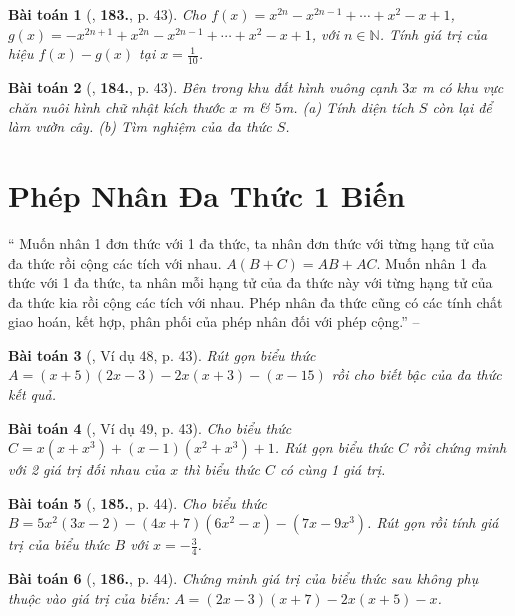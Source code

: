 \documentclass{article}
\numberwithin{equation}{section}
\newtheorem{baitoan}{Bài toán}
\begin{document}
\begin{baitoan}[\cite{Tuyen_Toan_7}, \textbf{183.}, p. 43]
	Cho $f(x) = x^{2n} - x^{2n-1} + \cdots + x^2 - x + 1$, $g(x) = -x^{2n+1} + x^{2n} - x^{2n-1} + \cdots + x^2 - x + 1$, với $n\in\mathbb{N}$. Tính giá trị của hiệu $f(x) - g(x)$ tại $x = \frac{1}{10}$.
\end{baitoan}

\begin{baitoan}[\cite{Tuyen_Toan_7}, \textbf{184.}, p. 43]
	Bên trong khu đất hình vuông cạnh $3x$ \emph{m} có khu vực chăn nuôi hình chữ nhật kích thước $x$ \emph{m} \& $5$\emph{m}. (a) Tính diện tích $S$ còn lại để làm vườn cây. (b) Tìm nghiệm của đa thức $S$.
\end{baitoan}


\section{Phép Nhân Đa Thức 1 Biến}
`` Muốn nhân 1 đơn thức với 1 đa thức, ta nhân đơn thức với từng hạng tử của đa thức rồi cộng các tích với nhau. $A(B + C) = AB + AC$.  Muốn nhân 1 đa thức với 1 đa thức, ta nhân mỗi hạng tử của đa thức này với từng hạng tử của đa thức kia rồi cộng các tích với nhau.  Phép nhân đa thức cũng có các tính chất giao hoán, kết hợp, phân phối của phép nhân đối với phép cộng.'' -- \cite[Chap. III, \S4, p. 43]{Tuyen_Toan_7}

\begin{baitoan}[\cite{Tuyen_Toan_7}, Ví dụ 48, p. 43]
	Rút gọn biểu thức $A =  (x + 5)(2x - 3) - 2x(x + 3) - (x - 15)$ rồi cho biết bậc của đa thức kết quả.
\end{baitoan}

\begin{baitoan}[\cite{Tuyen_Toan_7}, Ví dụ 49, p. 43]
	Cho biểu thức $C = x(x + x^3) + (x - 1)(x^2 + x^3) + 1$. Rút gọn biểu thức $C$ rồi chứng minh với 2 giá trị đối nhau của $x$ thì biểu thức $C$ có cùng 1 giá trị.
\end{baitoan}

\begin{baitoan}[\cite{Tuyen_Toan_7}, \textbf{185.}, p. 44]
	Cho biểu thức $B = 5x^2(3x - 2) - (4x + 7)(6x^2 - x) - (7x - 9x^3)$. Rút gọn rồi  tính giá trị của biểu thức $B$ với $x = -\frac{3}{4}$.
\end{baitoan}

\begin{baitoan}[\cite{Tuyen_Toan_7}, \textbf{186.}, p. 44]
	Chứng minh giá trị của biểu thức sau không phụ thuộc vào giá trị của biến: $A = (2x - 3)(x + 7) - 2x(x + 5) - x$. 
\end{baitoan}
\end{document}
